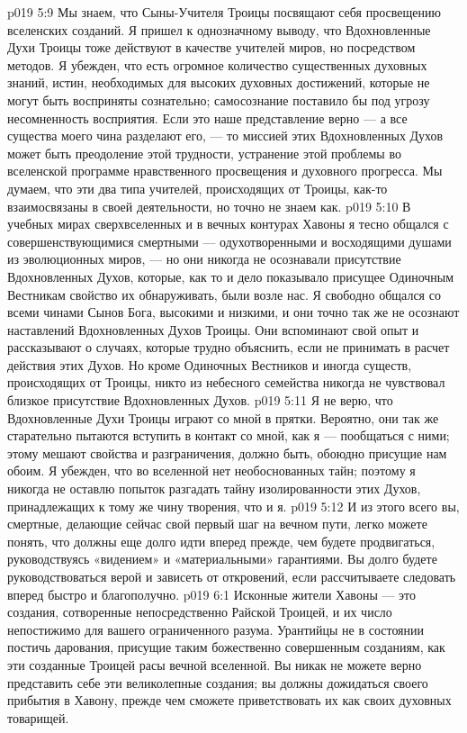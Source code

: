 \vs p019 5:9 Мы знаем, что Сыны\hyp{}Учителя Троицы посвящают себя  просвещению вселенских созданий. Я пришел к однозначному выводу, что Вдохновленные Духи Троицы тоже действуют в качестве учителей миров, но посредством  методов. Я убежден, что есть огромное количество существенных духовных знаний, истин, необходимых для высоких духовных достижений, которые не могут быть восприняты сознательно; самосознание поставило бы под угрозу несомненность восприятия. Если это наше представление верно --- а все существа моего чина разделают его, --- то миссией этих Вдохновленных Духов может быть преодоление этой трудности, устранение этой проблемы во вселенской программе нравственного просвещения и духовного прогресса. Мы думаем, что эти два типа учителей, происходящих от Троицы, как\hyp{}то взаимосвязаны в своей деятельности, но точно не знаем как.
\vs p019 5:10 В учебных мирах сверхвселенных и в вечных контурах Хавоны я тесно общался с совершенствующимися смертными --- одухотворенными и восходящими душами из эволюционных миров, --- но они никогда не осознавали присутствие Вдохновленных Духов, которые, как то и дело показывало присущее Одиночным Вестникам свойство их обнаруживать, были возле нас. Я свободно общался со всеми чинами Сынов Бога, высокими и низкими, и они точно так же не осознают наставлений Вдохновленных Духов Троицы. Они вспоминают свой опыт и рассказывают о случаях, которые трудно объяснить, если не принимать в расчет действия этих Духов. Но кроме Одиночных Вестников и иногда существ, происходящих от Троицы, никто из небесного семейства никогда не чувствовал близкое присутствие Вдохновленных Духов.
\vs p019 5:11 Я не верю, что Вдохновленные Духи Троицы играют со мной в прятки. Вероятно, они так же старательно пытаются вступить в контакт со мной, как я --- пообщаться с ними; этому мешают свойства и разграничения, должно быть, обоюдно присущие нам обоим. Я убежден, что во вселенной нет необоснованных тайн; поэтому я никогда не оставлю попыток разгадать тайну изолированности этих Духов, принадлежащих к тому же чину творения, что и я.
\vs p019 5:12 И из этого всего вы, смертные, делающие сейчас свой первый шаг на вечном пути, легко можете понять, что должны еще долго идти вперед прежде, чем будете продвигаться, руководствуясь «видением» и «материальными» гарантиями. Вы долго будете руководствоваться верой и зависеть от откровений, если рассчитываете следовать вперед быстро и благополучно.
\vs p019 6:1 Исконные жители Хавоны --- это создания, сотворенные непосредственно Райской Троицей, и их число непостижимо для вашего ограниченного разума. Урантийцы не в состоянии постичь дарования, присущие таким божественно совершенным созданиям, как эти созданные Троицей расы вечной вселенной. Вы никак не можете верно представить себе эти великолепные создания; вы должны дожидаться своего прибытия в Хавону, прежде чем сможете приветствовать их как своих духовных товарищей.
